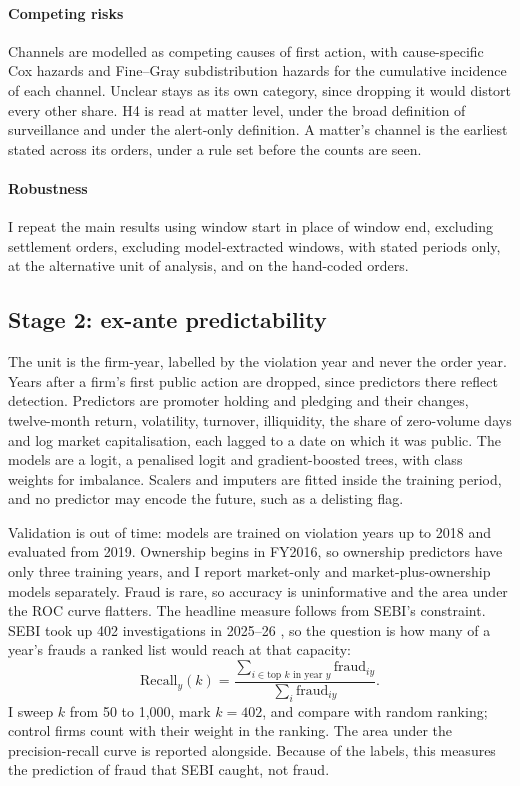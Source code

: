 \documentclass[letterpaper,11pt,leqno]{article}
\begin{document}
\paragraph{Competing risks} Channels are modelled as competing causes of first action, with cause-specific Cox hazards and Fine--Gray subdistribution hazards \citep{FG99} for the cumulative incidence of each channel. Unclear stays as its own category, since dropping it would distort every other share. H4 is read at matter level, under the broad definition of surveillance and under the alert-only definition. A matter's channel is the earliest stated across its orders, under a rule set before the counts are seen.

\paragraph{Robustness} I repeat the main results using window start in place of window end, excluding settlement orders, excluding model-extracted windows, with stated periods only, at the alternative unit of analysis, and on the hand-coded orders.

\subsection{Stage 2: ex-ante predictability}\label{s:stage2}

The unit is the firm-year, labelled by the violation year and never the order year. Years after a firm's first public action are dropped, since predictors there reflect detection. Predictors are promoter holding and pledging and their changes, twelve-month return, volatility, turnover, illiquidity, the share of zero-volume days and log market capitalisation, each lagged to a date on which it was public. The models are a logit, a penalised logit and gradient-boosted trees, with class weights for imbalance. Scalers and imputers are fitted inside the training period, and no predictor may encode the future, such as a delisting flag.

Validation is out of time: models are trained on violation years up to 2018 and evaluated from 2019. Ownership begins in FY2016, so ownership predictors have only three training years, and I report market-only and market-plus-ownership models separately. Fraud is rare, so accuracy is uninformative and the area under the ROC curve flatters. The headline measure follows from SEBI's constraint. SEBI took up 402 investigations in 2025--26 \citep{SEBI26a}, so the question is how many of a year's frauds a ranked list would reach at that capacity:
\begin{equation}
\text{Recall}_{y}(k) = \frac{\sum_{i \in \text{top } k \text{ in year } y} \text{fraud}_{iy}}{\sum_{i} \text{fraud}_{iy}}.
\label{e:recall}\end{equation}
I sweep $k$ from 50 to 1,000, mark $k = 402$, and compare with random ranking; control firms count with their weight in the ranking. The area under the precision-recall curve is reported alongside. Because of the labels, this measures the prediction of fraud that SEBI caught, not fraud.
\end{document}
